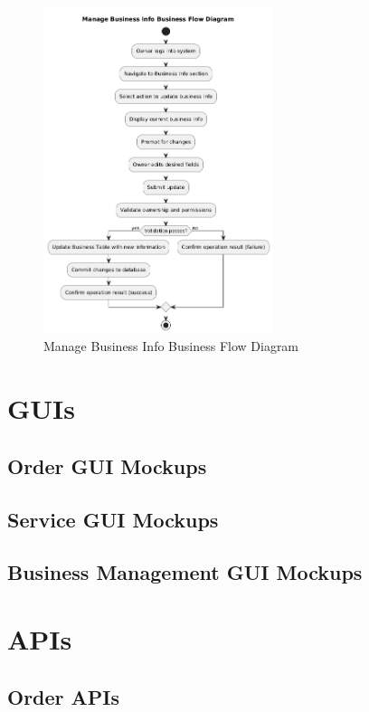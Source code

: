 \documentclass[]{VUMIFTemplateClass}
\begin{document}
\begin{figure}[H]
    \centering
    \includegraphics[width=0.6\textwidth]{images/diagrams/business/bpmn_business_info_manage.png}
    \caption{Manage Business Info Business Flow Diagram}
    \label{fig:business_info_manage_flow}
\end{figure}

\section{GUIs}

\subsection{Order GUI Mockups}
\subsection{Service GUI Mockups}
\subsection{Business Management GUI Mockups}

\section{APIs}
\subsection{Order APIs}
\end{document}

